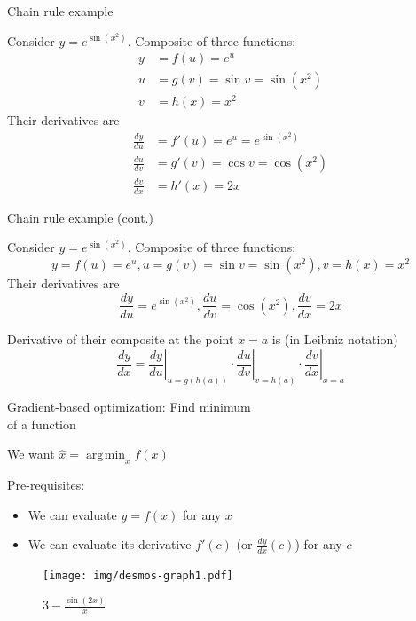 \documentclass[12pt,aspectratio=169,handout]{beamer}
\DeclareMathOperator*{\argmin}{arg\!\min}
\begin{document}
\begin{frame}{Chain rule example}
	
	Consider $y=e^{\sin(x^{2})}$. Composite of three functions:
	$$
	\begin{aligned}
		y &= f(u) = e^u \\
		u &= g(v) = \sin v = \sin (x^2) \\
		v &= h(x) = x^2
	\end{aligned}
	$$
	\pause
	Their derivatives are
	$$
	\begin{aligned}
		\frac{dy}{du} &= f'(u) = e^u = e^{\sin(x^{2})} \\
		\frac{du}{dv} &= g'(v) = \cos v = \cos (x^2) \\
		\frac{dv}{dx} &= h'(x) = 2x
	\end{aligned}
	$$
\end{frame}


\begin{frame}{Chain rule example (cont.)}
	
	Consider $y=e^{\sin(x^{2})}$. Composite of three functions:
	$$y = f(u) = e^u, u = g(v) = \sin v = \sin (x^2), v = h(x) = x^2$$
	Their derivatives are
	$$\frac{dy}{du} = e^{\sin(x^{2})}, \frac{du}{dv} = \cos (x^2), \frac{dv}{dx} = 2x$$
	
	\pause
	
	Derivative of their composite at the point $x = a$ is (in Leibniz notation)
	$$
	{\frac {dy}{dx}}=\left.{\frac {dy}{du}}\right|_{u=g(h(a))}\cdot \left.{\frac {du}{dv}}\right|_{v=h(a)}\cdot \left.{\frac {dv}{dx}}\right|_{x=a}
	$$
	
\end{frame}


\begin{frame}{Gradient-based optimization: Find minimum\\ of a function}
	
	We want $\hat{x} = \argmin_x f(x)$
	
	Pre-requisites:
	
	\begin{itemize}
		\item We can evaluate $y = f(x)$ for any $x$
		\item We can evaluate its derivative $f'(c)$ (or $\frac{dy}{dx}(c)$) for any $c$
	\end{itemize}
	
	\begin{figure}
		\texttt{[image: img/desmos-graph1.pdf]}	
		\caption{$3-\frac{\sin\left(2x\right)}{x}$}
	\end{figure}
	
\end{frame}
\end{document}
